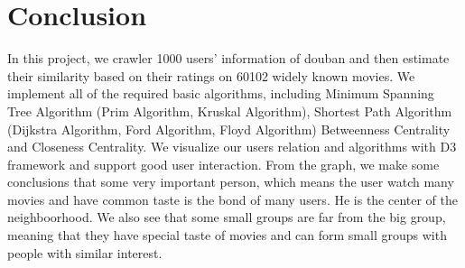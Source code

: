 \documentclass{article}
\begin{document}
\section{Conclusion}
In this project, we crawler 1000 users' information of douban and then estimate their similarity based on their ratings on 60102 widely known movies. We implement all of the required basic algorithms, including Minimum Spanning Tree Algorithm (Prim Algorithm, Kruskal Algorithm), Shortest Path Algorithm (Dijkstra Algorithm, Ford Algorithm, Floyd Algorithm) Betweenness Centrality and Closeness Centrality. We visualize our users relation and algorithms with D3 framework and support good user interaction. From the graph, we make some conclusions that some very important person, which means the user watch many movies and have common taste is the bond of many users. He is the center of the neighboorhood. We also see that some small groups are far from the big group, meaning that they have special taste of movies and can form small groups with people with similar interest.

\begin{small}

 
\end{small}

\medskip
\end{document}
